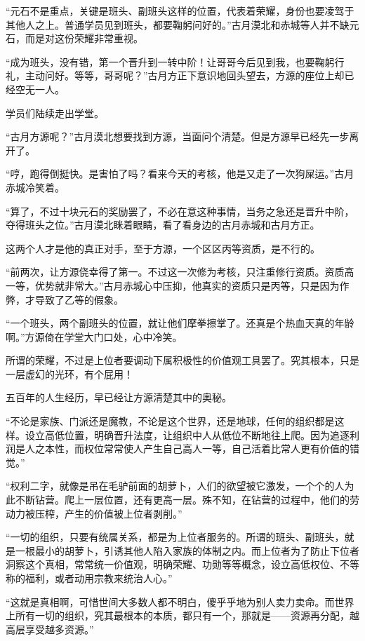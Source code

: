 \begin{this_body}
“元石不是重点，关键是班头、副班头这样的位置，代表着荣耀，身份也要凌驾于其他人之上。普通学员见到班头，都要鞠躬问好的。”古月漠北和赤城等人并不缺元石，而是对这份荣耀非常重视。

“成为班头，没有错，第一个晋升到一转中阶！让哥哥今后见到我，也要鞠躬行礼，主动问好。等等，哥哥呢？”古月方正下意识地回头望去，方源的座位上却已经空无一人。

学员们陆续走出学堂。

“古月方源呢？”古月漠北想要找到方源，当面问个清楚。但是方源早已经先一步离开了。

“哼，跑得倒挺快。是害怕了吗？看来今天的考核，他是又走了一次狗屎运。”古月赤城冷笑着。

“算了，不过十块元石的奖励罢了，不必在意这种事情，当务之急还是晋升中阶，夺得班头之位。”古月漠北眯着眼睛，看了看身边的古月赤城和古月方正。

这两个人才是他的真正对手，至于方源，一个区区丙等资质，是不行的。

“前两次，让方源侥幸得了第一。不过这一次修为考核，只注重修行资质。资质高一等，优势就非常大。”古月赤城心中压抑，他真实的资质只是丙等，只是因为作弊，才导致了乙等的假象。

“一个班头，两个副班头的位置，就让他们摩拳擦掌了。还真是个热血天真的年龄啊。”方源倚在学堂大门口处，心中冷笑。

所谓的荣耀，不过是上位者要调动下属积极性的价值观工具罢了。究其根本，只是一层虚幻的光环，有个屁用！

五百年的人生经历，早已经让方源清楚其中的奥秘。

“不论是家族、门派还是魔教，不论是这个世界，还是地球，任何的组织都是这样。设立高低位置，明确晋升法度，让组织中人从低位不断地往上爬。因为追逐利润是人之本性，而权位常常使人产生自己高人一等，自己活着比常人更有价值的错觉。”

“权利二字，就像是吊在毛驴前面的胡萝卜，人们的欲望被它激发，一个个的人为此不断钻营。爬上一层位置，还有更高一层。殊不知，在钻营的过程中，他们的劳动力被压榨，产生的价值被上位者剥削。”

“一切的组织，只要有统属关系，都是为上位者服务的。所谓的班头、副班头，就是一根最小的胡萝卜，引诱其他人陷入家族的体制之内。而上位者为了防止下位者洞察这个真相，常常统一价值观，明确荣耀、功勋等等概念，设立高低权位、不等称的福利，或者动用宗教来统治人心。”

“这就是真相啊，可惜世间大多数人都不明白，傻乎乎地为别人卖力卖命。而世界上所有一切的组织，究其最根本的本质，都只有一个，那就是——资源再分配，越高层享受越多资源。”


\end{this_body}
